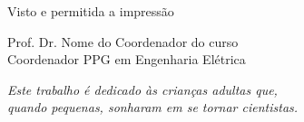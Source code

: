 \begin{folhadeaprovacao}
    \vspace*{\fill}
    \begin{flushleft}
    	Visto e permitida a impressão\\
        \imprimirlocal
    \end{flushleft}
    
    \vspace*{\fill}
    \hspace{.4\textwidth}
    \begin{minipage}{.5\textwidth}
    	Prof. Dr. Nome do Coordenador do curso \\
        Coordenador PPG em Engenharia Elétrica
    \end{minipage}%
  
\end{folhadeaprovacao}

\begin{dedicatoria}
   \vspace*{\fill}
   \centering
   \noindent
   \textit{ Este trabalho é dedicado às crianças adultas que,\\
   quando pequenas, sonharam em se tornar cientistas.} 
   \vspace*{\fill}
\end{dedicatoria}

\begin{agradecimentos}

    \lipsum[1]
\end{agradecimentos}


